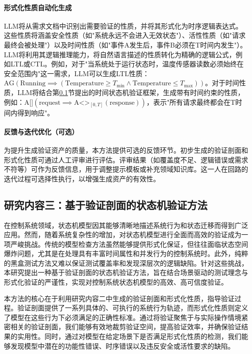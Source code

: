\paragraph{形式化性质自动化生成}
LLM将从需求文档中识别出需要验证的性质，并将其形式化为时序逻辑表达式。这些性质将涵盖安全性质（如"系统永远不会进入无效状态"）、活性性质（如"请求最终会被处理"）以及时间性质（如"事件A发生后，事件B必须在T时间内发生"）。LLM将利用其逻辑推理能力，将自然语言描述的性质转化为精确的逻辑公式，例如LTL或CTL。例如，对于"当系统处于运行状态时，温度传感器读数必须始终在安全范围内"这一需求，LLM可以生成LTL性质：\( \text{AG}(\text{Running} \implies (\text{Temperature} \ge T_{\text{min}} \land \text{Temperature} \le T_{\text{max}})) \)。对于时间性质，LLM将结合第\ref{section-tech-verification}节提出的时间状态机验证框架，生成带有时间约束的性质，例如：\( \text{A[]}(\text{request} \implies \text{A<>}_{[0, T]}(\text{response})) \)，表示"所有请求最终都会在T时间内得到响应"。

\paragraph{反馈与迭代优化（可选）}
为提升生成验证资产的质量，本方法提供可选的反馈环节。初步生成的验证剖面和形式化性质可通过人工评审进行评估。评审结果（如覆盖度不足、逻辑错误或需求不符等）可作为反馈信息，用于调整提示模板或补充领域知识库。这一人在回路的迭代过程可选择性执行，以增强生成资产的有效性。

\subsection{研究内容三：基于验证剖面的状态机验证方法}
\label{section-tech-verification}

在控制系统领域，状态机模型因其能够清晰地描述系统行为和状态迁移而得到广泛应用。然而，随着系统复杂性的增加，对状态机模型进行全面而高效的验证成为一项严峻挑战。传统的模型检查方法虽然能够提供形式化保证，但往往面临状态空间爆炸问题，尤其是在处理具有丰富时间属性和并发行为的控制系统时。此外，纯粹的黑盒测试方法又难以保证测试覆盖率和发现深层次的逻辑缺陷。针对这些挑战，本研究提出一种基于验证剖面的状态机验证方法，旨在结合场景驱动的测试理念与形式化验证的严谨性，实现对控制系统状态机模型的高效、高可信度验证。

本方法的核心在于利用研究内容二中生成的验证剖面和形式化性质，指导验证过程。验证剖面提供了一系列具体的、可执行的系统行为轨迹，而形式化性质则定义了模型在这些行为下必须满足的正确性标准。通过将验证聚焦于与实际操作情境紧密相关的验证剖面，我们能够有效地裁剪验证空间，提高验证效率，并确保验证结果的实用性。同时，通过对模型在给定场景下是否满足形式化性质的检测，我们能够发现模型中潜在的功能性错误、时序错误以及违反安全或活性要求的缺陷。


